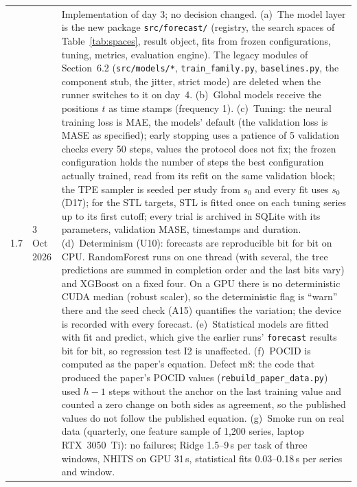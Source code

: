\documentclass[11pt,a4paper]{article}
\newcommand{\code}[1]{\texttt{#1}}
\begin{document}
\begin{longtable}{@{}p{1.3cm} p{1.9cm} p{11.8cm}@{}}
1.7 & 3 Oct 2026 & Implementation of day 3; no decision changed. (a)~The model layer is the new package \code{src/forecast/} (registry, the search spaces of Table~\ref{tab:spaces}, result object, fits from frozen configurations, tuning, metrics, evaluation engine). The legacy modules of Section~6.2 (\code{src/models/*}, \mbox{\code{train_family.py}}, \code{baselines.py}, the component stub, the jitter, strict mode) are deleted when the runner switches to it on day~4. (b)~Global models receive the positions $t$ as time stamps (frequency 1). (c)~Tuning: the neural training loss is MAE, the models' default (the validation loss is MASE as specified); early stopping uses a patience of 5 validation checks every 50 steps, values the protocol does not fix; the frozen configuration holds the number of steps the best configuration actually trained, read from its refit on the same validation block; the TPE sampler is seeded per study from $s_0$ and every fit uses $s_0$ (D17); for the STL targets, STL is fitted once on each tuning series up to its first cutoff; every trial is archived in SQLite with its parameters, validation MASE, timestamps and duration. (d)~Determinism (U10): forecasts are reproducible bit for bit on CPU. RandomForest runs on one thread (with several, the tree predictions are summed in completion order and the last bits vary) and XGBoost on a fixed four. On a GPU there is no deterministic CUDA median (robust scaler), so the deterministic flag is ``warn'' there and the seed check (A15) quantifies the variation; the device is recorded with every forecast. (e)~Statistical models are fitted with fit and predict, which give the earlier runs' \code{forecast} results bit for bit, so regression test I2 is unaffected. (f)~POCID is computed as the paper's equation. Defect m8: the code that produced the paper's POCID values (\code{rebuild_paper_data.py}) used $h-1$ steps without the anchor on the last training value and counted a zero change on both sides as agreement, so the published values do not follow the published equation. (g)~Smoke run on real data (quarterly, one feature sample of 1,200 series, laptop RTX~3050~Ti): no failures; Ridge 1.5--9\,s per task of three windows, NHITS on GPU 31\,s, statistical fits 0.03--0.18\,s per series and window. \\

\end{longtable}
\end{document}
